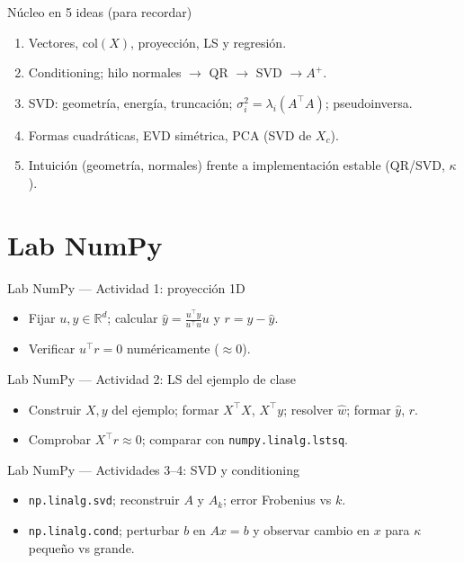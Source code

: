 \begin{frame}{Núcleo en 5 ideas (para recordar)}
\begin{enumerate}\small
  \item Vectores, \(\mathrm{col}(X)\), proyección, LS y regresión.
  \item Conditioning; hilo normales \(\rightarrow\) QR \(\rightarrow\) SVD \(\rightarrow A^+\).
  \item SVD: geometría, energía, truncación; \(\sigma_i^2=\lambda_i(A^\top A)\); pseudoinversa.
  \item Formas cuadráticas, EVD simétrica, PCA (SVD de \(X_c\)).
  \item Intuición (geometría, normales) frente a implementación estable (QR/SVD, \(\kappa\)).
\end{enumerate}
\end{frame}

\section[Lab NumPy]{Lab NumPy\label{sec:lab-numpy-w07}}

\begin{frame}{Lab NumPy — Actividad 1: proyección 1D}
\begin{itemize}\small
  \item Fijar \(u,y\in\mathbb{R}^d\); calcular \(\hat y=\frac{u^\top y}{u^\top u}u\) y \(r=y-\hat y\).
  \item Verificar \(u^\top r=0\) numéricamente (\(\approx 0\)).
\end{itemize}
\end{frame}

\begin{frame}{Lab NumPy — Actividad 2: LS del ejemplo de clase}
\begin{itemize}\small
  \item Construir \(X,y\) del ejemplo; formar \(X^\top X\), \(X^\top y\); resolver \(\hat w\); formar \(\hat y\), \(r\).
  \item Comprobar \(X^\top r\approx 0\); comparar con \texttt{numpy.linalg.lstsq}.
\end{itemize}
\end{frame}

\begin{frame}{Lab NumPy — Actividades 3--4: SVD y conditioning}
\begin{itemize}\small
  \item {} \texttt{np.linalg.svd}; reconstruir \(A\) y \(A_k\); error Frobenius vs \(k\).
  \item {} \texttt{np.linalg.cond}; perturbar \(b\) en \(Ax=b\) y observar cambio en \(x\) para \(\kappa\) pequeño vs grande.
\end{itemize}
\end{frame}

